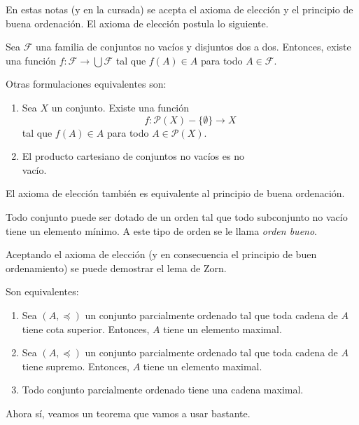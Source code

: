 En estas notas (y en la cursada) se acepta el axioma de elección y el principio de buena ordenación. El axioma de elección postula lo siguiente.

\begin{axiom}
	Sea $\mathcal{F}$ una familia de conjuntos no vacíos y disjuntos dos a dos. Entonces, existe una función $f: \mathcal{F} \to \bigcup \mathcal{F}$ tal que $f(A) \in A$ para todo $A \in \mathcal{F}$.
\end{axiom}

Otras formulaciones equivalentes son:

\begin{enumerate}[label=(\roman*)]
	\item Sea $X$ un conjunto. Existe una función
	      $$f: \mathcal{P}(X) - \{ \emptyset \} \to X$$
	      tal que $f(A) \in A$ para todo $A \in \mathcal{P}(X)$.
	\item El producto cartesiano de conjuntos no vacíos es no\\ vacío.
\end{enumerate}

El axioma de elección también es equivalente al principio de buena ordenación.

\begin{axiom}
	Todo conjunto puede ser dotado de un orden tal que todo subconjunto no vacío tiene un elemento mínimo. A este tipo de orden se le llama \textit{orden bueno}.
\end{axiom}

Aceptando el axioma de elección (y en consecuencia el principio de buen ordenamiento) se puede demostrar el lema de Zorn.

\begin{axiom}
	Son equivalentes:
	\begin{enumerate}
		\item Sea $(A, \preceq)$ un conjunto parcialmente ordenado tal que toda cadena de $A$ tiene cota superior. Entonces, $A$ tiene un elemento maximal.
		\item Sea $(A, \preceq)$ un conjunto parcialmente ordenado tal que toda cadena de $A$ tiene supremo. Entonces, $A$ tiene un elemento maximal.
		\item Todo conjunto parcialmente ordenado tiene una cadena maximal.
	\end{enumerate}
\end{axiom}

Ahora sí, veamos un teorema que vamos a usar bastante.

